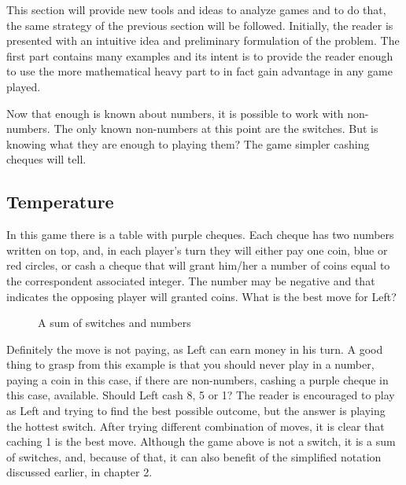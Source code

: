 
This section will provide new tools and ideas to analyze games and to do that, the same strategy of the previous section will be followed. Initially, the reader is presented with an intuitive idea and preliminary formulation of the problem. The first part contains many examples and its intent is to provide the reader enough to use the more mathematical heavy part to in fact gain advantage in any game played.

Now that enough is known about numbers, it is possible to work with non-numbers. The only known non-numbers at this point are the switches. But is knowing what they are enough to playing them? The game simpler cashing cheques will tell.

\subsection*{Temperature}

In this game there is a table with purple cheques. Each cheque has two numbers written on top, and, in each player's turn they will either pay one coin, blue or red circles, or cash a cheque that will grant him/her a number of coins equal to the correspondent associated integer. The number may be negative and that indicates the opposing player will granted coins. What is the best move for Left?

\begin{figure}[H]
\begin{center}
\end{center}
\caption{A sum of switches and numbers}
\end{figure}

Definitely the move is not paying, as Left can earn money in his turn. A good thing to grasp from this example is that you should never play in a number, paying a coin in this case, if there are non-numbers, cashing a purple cheque in this case, available. Should Left cash 8, 5 or 1? The reader is encouraged to play as Left and trying to find the best possible outcome, but the answer is playing the hottest switch. After trying different combination of moves, it is clear that caching 1 is the best move. Although the game above is not a switch, it is a sum of switches, and, because of that, it can also benefit of the simplified notation discussed earlier, in chapter 2.

